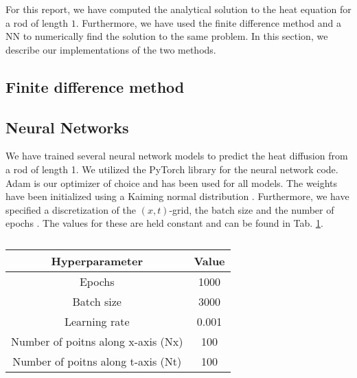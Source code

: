 For this report, we have computed the analytical solution to the heat equation for a rod of length $1$. 
Furthermore, we have used the finite difference method and a NN to numerically find the solution to the same problem. 
In this section, we describe our implementations of the two methods. 

\subsection{Finite difference method}



\subsection{Neural Networks}

We have trained several neural network models to predict the heat diffusion from a rod of length 1. 
We utilized the PyTorch library \cite{Ansel_PyTorch_2_Faster_2024}  for the neural network code. 
Adam is our optimizer of choice and has been used for all models. 
The weights have been initialized using a Kaiming normal distribution . 
Furthermore, we have specified a discretization of the $(x,t)$-grid, the batch size and the number of epochs . 
The values for these are held constant and can be found in Tab. \ref{tab:valuesfornn}. 

\begin{table}[h!]
    \centering
    \begin{tabular}{|c|c|}
    \hline
        \textbf{Hyperparameter} & \textbf{Value}  \\ \hline
        Epochs & 1000  \\ \hline
        Batch size & 3000 \\\hline
        Learning rate & 0.001 \\ \hline
        Number of poitns along x-axis (Nx) & 100 \\ \hline
        Number of poitns along t-axis (Nt) & 100 \\ \hline
    \end{tabular}
    \caption{}
    \label{tab:valuesfornn}
\end{table}


